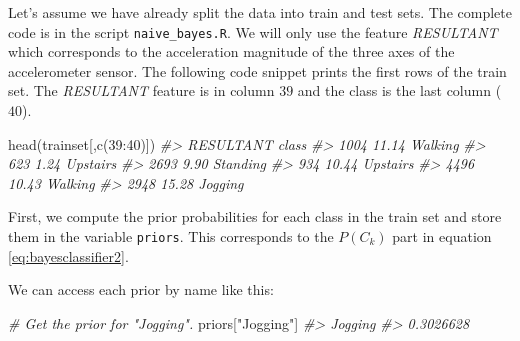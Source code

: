 \documentclass[
  11pt,
]{krantz}
\newenvironment{Shaded}{\begin{snugshade}}{\end{snugshade}}
\newcommand{\CommentTok}[1]{\textcolor[rgb]{0.37,0.37,0.37}{\textit{#1}}}
\newcommand{\DecValTok}[1]{\textcolor[rgb]{0.06,0.06,0.06}{#1}}
\newcommand{\FunctionTok}[1]{\textcolor[rgb]{0,0,0}{#1}}
\newcommand{\NormalTok}[1]{#1}
\newcommand{\OtherTok}[1]{\textcolor[rgb]{0.37,0.37,0.37}{#1}}
\newcommand{\SpecialCharTok}[1]{\textcolor[rgb]{0,0,0}{#1}}
\newcommand{\StringTok}[1]{\textcolor[rgb]{0.5,0.5,0.5}{#1}}
\begin{document}
Let's assume we have already split the data into train and test sets. The complete code is in the script \texttt{naive\_bayes.R}. We will only use the feature \emph{RESULTANT} which corresponds to the acceleration magnitude of the three axes of the accelerometer sensor. The following code snippet prints the first rows of the train set. The \emph{RESULTANT} feature is in column \(39\) and the class is the last column (\(40\)).

\begin{Shaded}
\begin{Highlighting}[]
\FunctionTok{head}\NormalTok{(trainset[,}\FunctionTok{c}\NormalTok{(}\DecValTok{39}\SpecialCharTok{:}\DecValTok{40}\NormalTok{)])}
\CommentTok{\#\textgreater{}      RESULTANT    class}
\CommentTok{\#\textgreater{} 1004     11.14  Walking}
\CommentTok{\#\textgreater{} 623       1.24 Upstairs}
\CommentTok{\#\textgreater{} 2693      9.90 Standing}
\CommentTok{\#\textgreater{} 934      10.44 Upstairs}
\CommentTok{\#\textgreater{} 4496     10.43  Walking}
\CommentTok{\#\textgreater{} 2948     15.28  Jogging}
\end{Highlighting}
\end{Shaded}

First, we compute the prior probabilities for each class in the train set and store them in the variable \texttt{priors}. This corresponds to the \(P(C_k)\) part in equation \eqref{eq:bayesclassifier2}.

\begin{Shaded}
\end{Shaded}

We can access each prior by name like this:

\begin{Shaded}
\begin{Highlighting}[]
\CommentTok{\# Get the prior for "Jogging".}
\NormalTok{priors[}\StringTok{"Jogging"}\NormalTok{]}
\CommentTok{\#\textgreater{}   Jogging }
\CommentTok{\#\textgreater{} 0.3026628 }
\end{Highlighting}
\end{Shaded}
\end{document}
